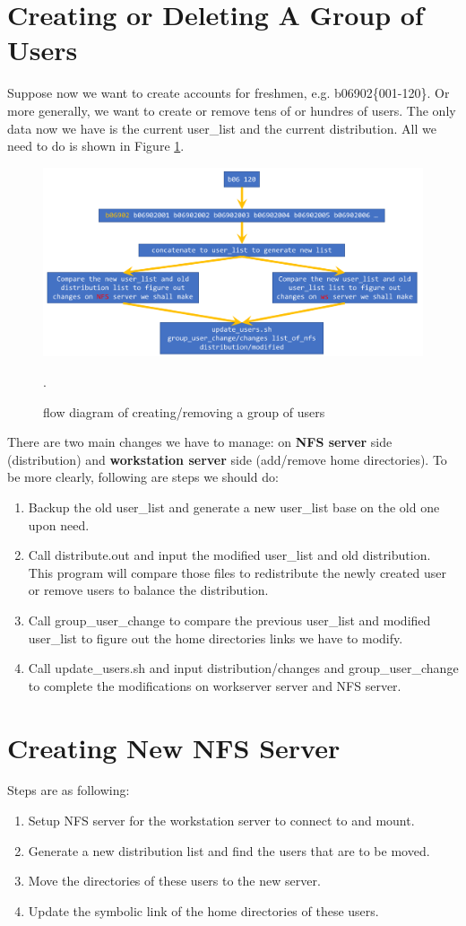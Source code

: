 \documentclass{article}
\begin{document}
\section{Creating or Deleting A Group of Users}
Suppose now we want to create accounts for freshmen, e.g. b06902\{001-120\}. 
Or more generally, we want to create or remove tens of or hundres of users.
The only data now we have is the current user\_list and the current distribution.
All we need to do is shown in Figure \ref{userChange}.
\begin{figure}[h]
\centering
\includegraphics[width=\textwidth]{Fig2.png}
\caption{flow diagram of creating/removing a group of users}
\label{userChange}.
\end{figure}
There are two main changes we have to manage: on {\bf NFS server} side (distribution) and {\bf workstation server} side
(add/remove home directories). To be more clearly, following are steps we should do:
   \begin{enumerate}
   \item Backup the old user\_list and generate a new user\_list base on the old one upon need.
   \item Call {\cs distribute.out} and input the modified user\_list and old distribution.
   This program will compare those files to redistribute the newly created user or remove users to balance the distribution.
   \item Call {\cs group\_user\_change} to compare the previous user\_list and modified user\_list to figure out
   the home directories links we have to modify.
   \item Call {\cs update\_users.sh} and input distribution/changes and group\_user\_change to complete the modifications on workserver server and NFS server.
   \end{enumerate}

\section{Creating New NFS Server}
Steps are as following:
   \begin{enumerate}
   \item Setup NFS server for the workstation server to connect to and mount.
   \item Generate a new distribution list and find the users that are to be moved.
   \item Move the directories of these users to the new server.
   \item Update the symbolic link of the home directories of these users.
   \end{enumerate}
\end{document}
